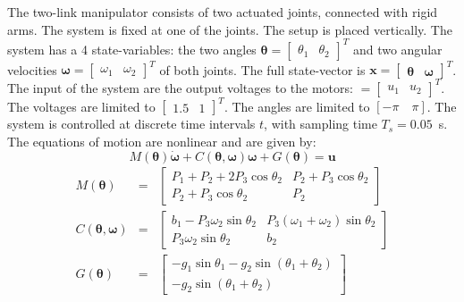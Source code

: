 The two-link manipulator consists of two actuated joints, connected with rigid arms. The system is fixed at one of the joints. The setup is placed vertically. The system has a 4 state-variables: the two angles $\bm{\theta} = \begin{bmatrix} \theta_1 & \theta_2 \end{bmatrix}^T$ and two angular velocities $\bm{\omega} = \begin{bmatrix}\omega_1 & \omega_2 \end{bmatrix}^T$ of both joints. The full state-vector is $\mathbf{x} =  \begin{bmatrix} \bm{\theta} & \bm{\omega} \end{bmatrix}^T$. The input of the system are the output voltages to the motors: $ = \begin{bmatrix} u_1 & u_2 \end{bmatrix}^T$. The voltages are limited to $\begin{bmatrix} 1.5 & 1 \end{bmatrix}^T$. The angles are limited to $[-\pi \quad \pi]$. The system is controlled at discrete time intervals $t$, with sampling time $T_s = 0.05$~s. The equations of motion are nonlinear and are given by:
$$
	M(\bm{\theta})\dot{\bm{\omega}}+ C(\bm{\theta}, \bm{\omega}) \bm{\omega} + G(\bm{\theta}) = \mathbf{u}
$$
\begin{eqnarray}
	M(\bm{\theta}) &=& \begin{bmatrix}
	P_1 + P_2 + 2P_3 \cos{\theta_2} & P_2 + P_3 \cos{\theta_2} \\
	P_2 + P_3 \cos{\theta_2} & P_2 \end{bmatrix} \nonumber
	\\
	C(\bm{\theta}, \bm{\omega}) &=& 
	\begin{bmatrix} b_1 - P_3 \omega_2 \sin{\theta_2} & P_3(\omega_1+\omega_2) \sin{\theta_2} \\
	P_3 \omega_2 \sin{\theta_2} & b_2 \end{bmatrix} \nonumber
	\\
	G(\bm{\theta}) &=& \begin{bmatrix} -g_1 \sin{\theta_1}-g_2 \sin{(\theta_1 + \theta_2)} \\
	-g_2 \sin{(\theta_1+\theta_2)} \end{bmatrix} \nonumber
\end{eqnarray}
